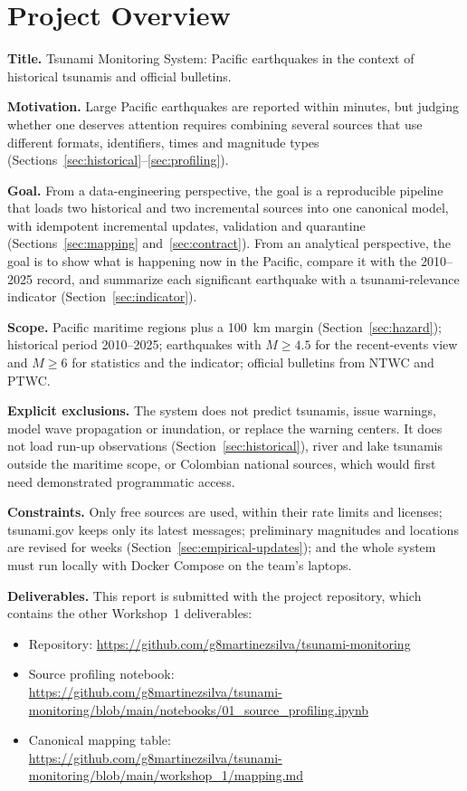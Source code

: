\documentclass[a4paper,11pt,oneside]{book}
\begin{document}
\section{Project Overview}
\textbf{Title.} Tsunami Monitoring System: Pacific earthquakes in the context of historical tsunamis and official bulletins.

\textbf{Motivation.} Large Pacific earthquakes are reported within minutes, but judging whether one deserves attention requires combining several sources that use different formats, identifiers, times and magnitude types (Sections~\ref{sec:historical}--\ref{sec:profiling}).

\textbf{Goal.} From a data-engineering perspective, the goal is a reproducible pipeline that loads two historical and two incremental sources into one canonical model, with idempotent incremental updates, validation and quarantine (Sections~\ref{sec:mapping} and~\ref{sec:contract}).
From an analytical perspective, the goal is to show what is happening now in the Pacific, compare it with the 2010--2025 record, and summarize each significant earthquake with a tsunami-relevance indicator (Section~\ref{sec:indicator}).

\textbf{Scope.} Pacific maritime regions plus a 100~km margin (Section~\ref{sec:hazard}); historical period 2010--2025; earthquakes with $M \geq 4.5$ for the recent-events view and $M \geq 6$ for statistics and the indicator; official bulletins from NTWC and PTWC.

\textbf{Explicit exclusions.} The system does not predict tsunamis, issue warnings, model wave propagation or inundation, or replace the warning centers.
It does not load run-up observations (Section~\ref{sec:historical}), river and lake tsunamis outside the maritime scope, or Colombian national sources, which would first need demonstrated programmatic access.

\textbf{Constraints.} Only free sources are used, within their rate limits and licenses; tsunami.gov keeps only its latest messages; preliminary magnitudes and locations are revised for weeks (Section~\ref{sec:empirical-updates}); and the whole system must run locally with Docker Compose on the team's laptops.

\textbf{Deliverables.} This report is submitted with the project repository, which contains the other Workshop~1 deliverables:
\begin{itemize}[nosep]
  \item Repository: \url{https://github.com/g8martinezsilva/tsunami-monitoring}
  \item Source profiling notebook:\\ \url{https://github.com/g8martinezsilva/tsunami-monitoring/blob/main/notebooks/01_source_profiling.ipynb}
  \item Canonical mapping table:\\ \url{https://github.com/g8martinezsilva/tsunami-monitoring/blob/main/workshop_1/mapping.md}
\end{itemize}
\end{document}
